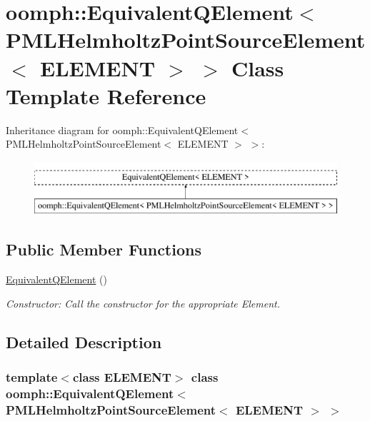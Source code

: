 \hypertarget{classoomph_1_1EquivalentQElement_3_01PMLHelmholtzPointSourceElement_3_01ELEMENT_01_4_01_4}{}\section{oomph\+:\+:Equivalent\+Q\+Element$<$ P\+M\+L\+Helmholtz\+Point\+Source\+Element$<$ E\+L\+E\+M\+E\+NT $>$ $>$ Class Template Reference}
\label{classoomph_1_1EquivalentQElement_3_01PMLHelmholtzPointSourceElement_3_01ELEMENT_01_4_01_4}
Inheritance diagram for oomph\+:\+:Equivalent\+Q\+Element$<$ P\+M\+L\+Helmholtz\+Point\+Source\+Element$<$ E\+L\+E\+M\+E\+NT $>$ $>$\+:\begin{figure}[H]
\begin{center}
\leavevmode
\includegraphics[height=2.000000cm]{classoomph_1_1EquivalentQElement_3_01PMLHelmholtzPointSourceElement_3_01ELEMENT_01_4_01_4}
\end{center}
\end{figure}
\subsection*{Public Member Functions}
\begin{DoxyCompactItemize}
\item 
\hyperlink{classoomph_1_1EquivalentQElement_3_01PMLHelmholtzPointSourceElement_3_01ELEMENT_01_4_01_4_af5fac6bf3394d799567523c3851288f2}{Equivalent\+Q\+Element} ()
\begin{DoxyCompactList}\small\item\em Constructor\+: Call the constructor for the appropriate Element. \end{DoxyCompactList}\end{DoxyCompactItemize}


\subsection{Detailed Description}
\subsubsection*{template$<$class E\+L\+E\+M\+E\+NT$>$\newline
class oomph\+::\+Equivalent\+Q\+Element$<$ P\+M\+L\+Helmholtz\+Point\+Source\+Element$<$ E\+L\+E\+M\+E\+N\+T $>$ $>$}

